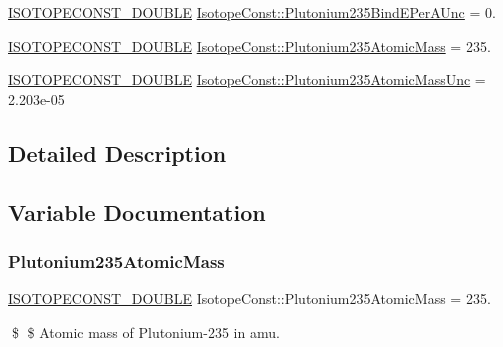 \begin{DoxyCompactItemize}
\mbox{\hyperlink{group___isotope_const-_macros_ga8f45a7272ce02c0b4c65c44636ed719a}{I\+S\+O\+T\+O\+P\+E\+C\+O\+N\+S\+T\+\_\+\+D\+O\+U\+B\+LE}} \mbox{\hyperlink{group___isotope_const-_plutonium-_pu235_ga57d3c049780cd4349b67365d0b839702}{Isotope\+Const\+::\+Plutonium235\+Bind\+E\+Per\+A\+Unc}} = 0.
\item 
\mbox{\hyperlink{group___isotope_const-_macros_ga8f45a7272ce02c0b4c65c44636ed719a}{I\+S\+O\+T\+O\+P\+E\+C\+O\+N\+S\+T\+\_\+\+D\+O\+U\+B\+LE}} \mbox{\hyperlink{group___isotope_const-_plutonium-_pu235_gaaff7e6fb3a1dd411521cb67faa15e3ca}{Isotope\+Const\+::\+Plutonium235\+Atomic\+Mass}} = 235.
\item 
\mbox{\hyperlink{group___isotope_const-_macros_ga8f45a7272ce02c0b4c65c44636ed719a}{I\+S\+O\+T\+O\+P\+E\+C\+O\+N\+S\+T\+\_\+\+D\+O\+U\+B\+LE}} \mbox{\hyperlink{group___isotope_const-_plutonium-_pu235_gaa675dd81a04a2aa081cda411289720d8}{Isotope\+Const\+::\+Plutonium235\+Atomic\+Mass\+Unc}} = 2.\+203e-\/05
\end{DoxyCompactItemize}


\subsection{Detailed Description}


\subsection{Variable Documentation}
\mbox{\label{group___isotope_const-_plutonium-_pu235_gaaff7e6fb3a1dd411521cb67faa15e3ca}} 
\subsubsection{\texorpdfstring{Plutonium235\+Atomic\+Mass}{Plutonium235AtomicMass}}
{\footnotesize\ttfamily \mbox{\hyperlink{group___isotope_const-_macros_ga8f45a7272ce02c0b4c65c44636ed719a}{I\+S\+O\+T\+O\+P\+E\+C\+O\+N\+S\+T\+\_\+\+D\+O\+U\+B\+LE}} Isotope\+Const\+::\+Plutonium235\+Atomic\+Mass = 235.}

\$ \$ Atomic mass of Plutonium-\/235 in amu. \mbox{\label{group___isotope_const-_plutonium-_pu235_gaa675dd81a04a2aa081cda411289720d8}} 
